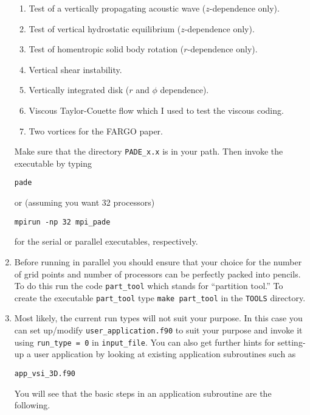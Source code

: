 \documentclass[11pt]{amsart}
\begin{document}
\begin{enumerate}
\begin{enumerate}
\item Test of a vertically propagating acoustic wave ($z$-dependence only).
\item Test of vertical hydrostatic equilibrium ($z$-dependence only).
\item Test of homentropic solid body rotation ($r$-dependence only).
\item Vertical shear instability.
\item Vertically integrated disk ($r$ and $\phi$ dependence).
\item Viscous Taylor-Couette flow which I used to test the viscous coding.
\item Two vortices for the FARGO paper.
\end{enumerate}
%
Make sure that the directory {\tt PADE\_x.x} is in your path.  Then invoke the 
executable by typing

\begin{verbatim}
pade
\end{verbatim}

or (assuming you want 32 processors)

\begin{verbatim}
mpirun -np 32 mpi_pade
\end{verbatim}
%
for the serial or parallel executables, respectively. 

\item Before running in parallel you should ensure that your choice for the
number of grid points and number of processors can be perfectly packed into pencils.  To do this
run the code {\tt part\_tool} which stands for ``partition tool.''  To create the executable {\tt part\_tool}  type {\tt make part\_tool} in the {\tt TOOLS} directory.

\item Most likely, the current run types will not suit your purpose.
In this case you can set up/modify {\tt user\_application.f90} to suit
your purpose and invoke it using {\tt run\_type = 0} in
{\tt input\_file}.  You can also get further hints for setting-up a user application by looking at
existing application subroutines such as
%
\begin{verbatim}
app_vsi_3D.f90
\end{verbatim}

You will see that the basic steps in an application subroutine are the following.


\end{enumerate}
\end{document}
